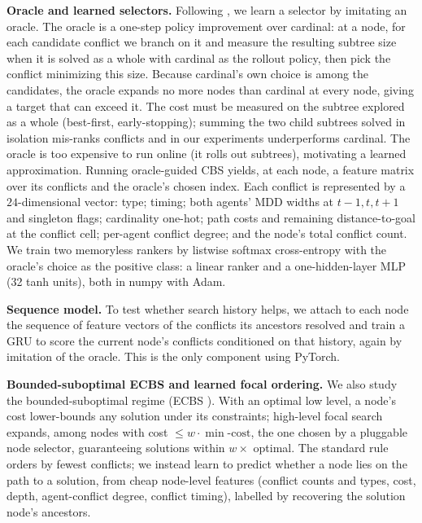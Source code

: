 \documentclass{article}
\theoremstyle{plain}
\theoremstyle{definition}
\theoremstyle{remark}
\begin{document}
\textbf{Oracle and learned selectors.} Following
\cite{Huang2020resolveconflictsforMAPF}, we learn a selector by imitating an
oracle. The oracle is a one-step policy improvement over cardinal: at a node, for
each candidate conflict we branch on it and measure the resulting subtree size
when it is solved as a whole with cardinal as the rollout policy, then pick the
conflict minimizing this size. Because cardinal's own choice is among the
candidates, the oracle expands no more nodes than cardinal at every node, giving
a target that can exceed it. The cost must be measured on the subtree explored as
a whole (best-first, early-stopping); summing the two child subtrees solved in
isolation mis-ranks conflicts and in our experiments underperforms cardinal. The
oracle is too expensive to run online (it rolls out subtrees), motivating a
learned approximation. Running oracle-guided CBS yields, at each node, a feature
matrix over its conflicts and the oracle's chosen index. Each conflict is
represented by a $24$-dimensional vector: type; timing; both agents' MDD widths
at $t{-}1,t,t{+}1$ and singleton flags; cardinality one-hot; path costs and
remaining distance-to-goal at the conflict cell; per-agent conflict degree; and
the node's total conflict count. We train two memoryless rankers by listwise
softmax cross-entropy with the oracle's choice as the positive class: a linear
ranker and a one-hidden-layer MLP (32 tanh units), both in numpy with Adam.

\textbf{Sequence model.} To test whether search history helps, we attach to each
node the sequence of feature vectors of the conflicts its ancestors resolved and
train a GRU to score the current node's conflicts conditioned on that history,
again by imitation of the oracle. This is the only component using PyTorch.

\textbf{Bounded-suboptimal ECBS and learned focal ordering.} We also study the
bounded-suboptimal regime (ECBS \cite{barer2014suboptimal}). With an optimal low
level, a node's cost lower-bounds any solution under its constraints; high-level
focal search expands, among nodes with cost $\le w\cdot\min\text{-cost}$, the one
chosen by a pluggable node selector, guaranteeing solutions within $w\times$
optimal. The standard rule orders by fewest conflicts; we instead learn to
predict whether a node lies on the path to a solution, from cheap node-level
features (conflict counts and types, cost, depth, agent-conflict degree, conflict
timing), labelled by recovering the solution node's ancestors.
\end{document}
